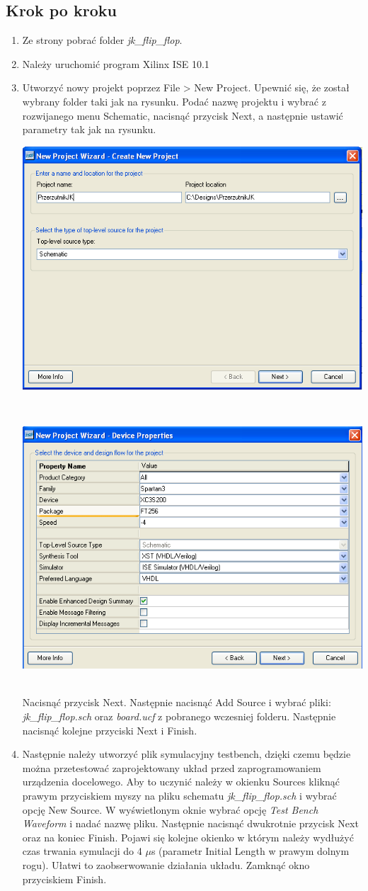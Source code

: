 \documentclass[12pt]{article}
\begin{document}
\subsection{Krok po kroku}
\begin{enumerate}[wide, labelwidth=!, labelindent=0pt]
\item Ze strony pobrać folder \textit{jk\_flip\_flop}.
\item Należy uruchomić program Xilinx ISE 10.1
\item Utworzyć nowy projekt poprzez File > New Project.
Upewnić się, że został wybrany folder taki jak na rysunku. Podać nazwę projektu i wybrać z rozwijanego menu Schematic, nacisnąć przycisk Next, a następnie ustawić parametry tak jak na rysunku.\\
\centerline{\includegraphics[width=0.7\linewidth]{1.PNG}}\\
\centerline{\includegraphics[width=0.7\linewidth]{2.PNG}}\\
Nacisnąć przycisk Next. Następnie nacisnąć Add Source i wybrać pliki:\textit{ jk\_flip\_flop.sch} oraz \textit{board.ucf} z pobranego wczesniej folderu. Następnie nacisnąć kolejne przyciski Next i Finish.
\item Następnie należy utworzyć plik symulacyjny testbench, dzięki czemu będzie można przetestować zaprojektowany układ przed zaprogramowaniem urządzenia docelowego. Aby to uczynić należy w okienku Sources kliknąć prawym przyciskiem myszy na pliku schematu \textit{jk\_flip\_flop.sch} i wybrać opcję New Source. W wyświetlonym oknie wybrać opcję \textit{Test Bench Waveform} i nadać nazwę pliku. Następnie nacisnąć dwukrotnie przycisk Next oraz na koniec Finish. Pojawi się kolejne okienko w którym należy wydłużyć czas trwania symulacji do 4 $\mu$s (parametr Initial Length w prawym dolnym rogu). Ułatwi to zaobserwowanie działania układu. Zamknąć okno przyciskiem Finish. \\

\end{enumerate}
\end{document}

